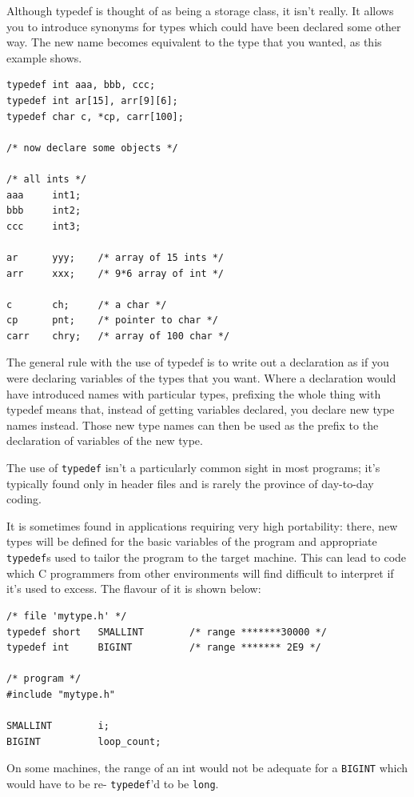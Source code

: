   

  Although typedef is thought of as being a storage class, it isn't
   really. It allows you to introduce synonyms for types which could have
   been declared some other way. The new name becomes equivalent to the type
   that you wanted, as this example shows.


\begin{Verbatim}
typedef int aaa, bbb, ccc;
typedef int ar[15], arr[9][6];
typedef char c, *cp, carr[100];

/* now declare some objects */

/* all ints */
aaa     int1;
bbb     int2;
ccc     int3;

ar      yyy;    /* array of 15 ints */
arr     xxx;    /* 9*6 array of int */

c       ch;     /* a char */
cp      pnt;    /* pointer to char */
carr    chry;   /* array of 100 char */
\end{Verbatim}

  The general rule with the use of typedef is to write out a declaration
   as if you were declaring variables of the types that you want. Where
   a declaration would have introduced names with particular types,
   prefixing the whole thing with typedef means that, instead of getting
   variables declared, you declare new type names instead. Those new type
   names can then be used as the prefix to the declaration of variables of
   the new type.


  The use of \texttt{typedef} isn't a particularly common sight in
   most programs; it's typically found only in header files and is rarely
   the province of day-to-day coding.


  It is sometimes found in applications requiring very high portability:
   there, new types will be defined for the basic variables of the program
   and appropriate \texttt{typedef}s used to tailor the program to the
   target machine. This can lead to code which C programmers from other
   environments will find difficult to interpret if it's used to excess. The
   flavour of it is shown below:


\begin{Verbatim}
/* file 'mytype.h' */
typedef short   SMALLINT        /* range *******30000 */
typedef int     BIGINT          /* range ******* 2E9 */

/* program */
#include "mytype.h"

SMALLINT        i;
BIGINT          loop_count;
\end{Verbatim}

  On some machines, the range of an int would not be adequate for
   a \texttt{BIGINT} which would have to be re- \texttt{typedef}'d
   to be \texttt{long}.


